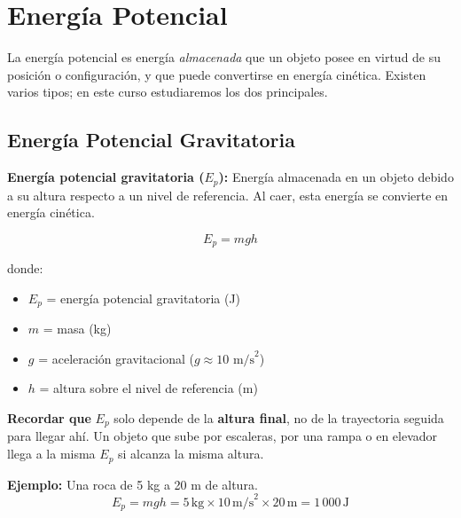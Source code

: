 \newpage

\section{Energía Potencial}

\begin{seccion}
La energía potencial es energía \textit{almacenada} que un objeto posee en virtud de su posición o configuración, y que puede convertirse en energía cinética. Existen varios tipos; en este curso estudiaremos los dos principales.
\end{seccion}

\subsection{Energía Potencial Gravitatoria}

\begin{seccion}
\begin{definicion}
    \textbf{Energía potencial gravitatoria ($E_p$):} Energía almacenada en un objeto debido a su altura respecto a un nivel de referencia. Al caer, esta energía se convierte en energía cinética.
\end{definicion}

\begin{ecuacion}
$$E_p = mgh$$

donde:
\begin{itemize}
    \item $E_p$ = energía potencial gravitatoria (J)
    \item $m$ = masa (kg)
    \item $g$ = aceleración gravitacional ($g \approx 10 \text{ m/s}^2$)
    \item $h$ = altura sobre el nivel de referencia (m)
\end{itemize}
\end{ecuacion}

\textbf{Recordar que} $E_p$ solo depende de la \textbf{altura final}, no de la trayectoria seguida para llegar ahí. Un objeto que sube por escaleras, por una rampa o en elevador llega a la misma $E_p$ si alcanza la misma altura.

\vspace{0.3cm}

\textbf{Ejemplo:} Una roca de 5 kg a 20 m de altura.
$$E_p = mgh = 5\,\text{kg} \times 10\,\text{m/s}^2 \times 20\,\text{m} = 1\,000\,\text{J}$$
\end{seccion}

